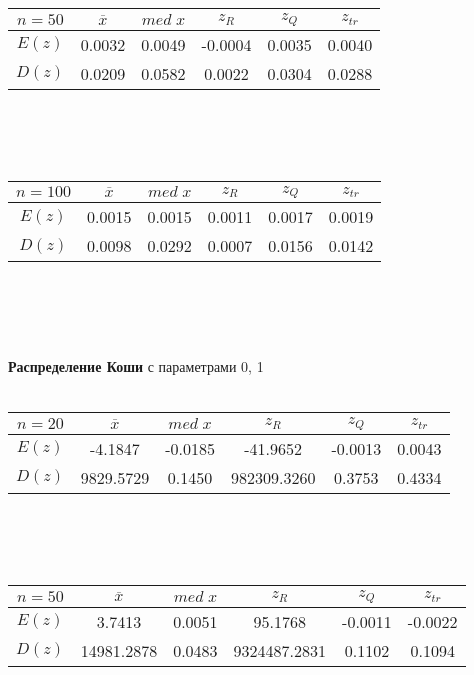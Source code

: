 \documentclass[12pt]{article}
\begin{document}
\\
\\ \\ 
\begin{tabular}{ | c | c | c | c | c | c |}
\hline
$n = 50$ & $\overline{x}$ & $med\;x$ & $z_R$ & $z_Q$ & $z_{tr}$ \\ \hline
$E(z)$ & 0.0032 & 0.0049 & -0.0004 & 0.0035 & 0.0040 \\ \hline
$D(z)$ & 0.0209 & 0.0582 & 0.0022 & 0.0304 & 0.0288 \\ \hline
\end{tabular}
\\
\\ \\ 
\begin{tabular}{ | c | c | c | c | c | c |}
\hline
$n = 100$ & $\overline{x}$ & $med\;x$ & $z_R$ & $z_Q$ & $z_{tr}$ \\ \hline
$E(z)$ & 0.0015 & 0.0015 & 0.0011 & 0.0017 & 0.0019 \\ \hline
$D(z)$ & 0.0098 & 0.0292 & 0.0007 & 0.0156 & 0.0142 \\ \hline
\end{tabular}
\\ \\ 
\\ \\
\textbf{Распределение Коши} с параметрами 0, 1
\\  \\
\begin{tabular}{ | c | c | c | c | c | c |}
\hline
$n = 20$ & $\overline{x}$ & $med\;x$ & $z_R$ & $z_Q$ & $z_{tr}$ \\ \hline
$E(z)$ & -4.1847 & -0.0185 & -41.9652 & -0.0013 & 0.0043 \\ \hline
$D(z)$ & 9829.5729 & 0.1450 & 982309.3260 & 0.3753 & 0.4334 \\ \hline
\end{tabular}
\\
\\ \\ 
\begin{tabular}{ | c | c | c | c | c | c |}
\hline
$n = 50$ & $\overline{x}$ & $med\;x$ & $z_R$ & $z_Q$ & $z_{tr}$ \\ \hline
$E(z)$ & 3.7413 & 0.0051 & 95.1768 & -0.0011 & -0.0022 \\ \hline
$D(z)$ & 14981.2878 & 0.0483 & 9324487.2831 & 0.1102 & 0.1094 \\ \hline
\end{tabular}
\end{document}
